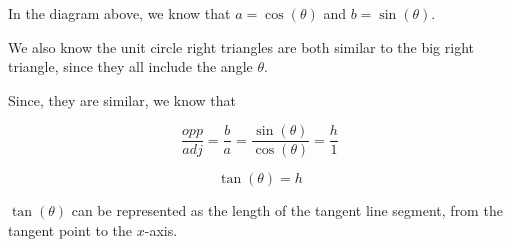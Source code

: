 \documentclass{ximera}
\begin{document}
\begin{image}
\end{image}




In the diagram above, we know that $a = \cos(\theta)$ and $b = \sin(\theta)$.

We also know the unit circle right triangles are both similar to the big right triangle, since they all include the angle $\theta$.

Since, they are similar, we know that 


\[    \frac{opp}{adj} = \frac{b}{a}  = \frac{\sin(\theta)}{\cos(\theta)}   = \frac{h}{1}          \]


\[         \tan(\theta) = h\]




$\tan(\theta)$ can be represented as the length of the tangent line segment, from the tangent point to the $x$-axis.
\end{document}
